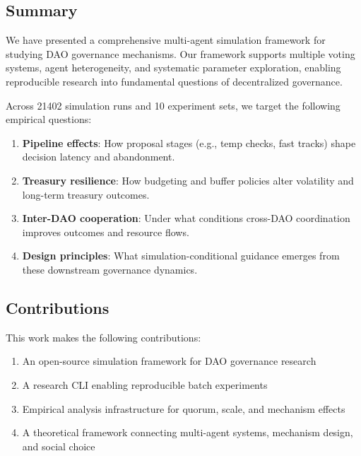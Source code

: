 
\subsection{Summary}

We have presented a comprehensive multi-agent simulation framework for studying DAO governance mechanisms. Our framework supports multiple voting systems, agent heterogeneity, and systematic parameter exploration, enabling reproducible research into fundamental questions of decentralized governance.

Across 21402 simulation runs and 10 experiment sets, we target the following empirical questions:

\begin{enumerate}
    \item \textbf{Pipeline effects}: How proposal stages (e.g., temp checks, fast tracks) shape decision latency and abandonment.

    \item \textbf{Treasury resilience}: How budgeting and buffer policies alter volatility and long-term treasury outcomes.

    \item \textbf{Inter-DAO cooperation}: Under what conditions cross-DAO coordination improves outcomes and resource flows.

    \item \textbf{Design principles}: What simulation-conditional guidance emerges from these downstream governance dynamics.
\end{enumerate}

\subsection{Contributions}

This work makes the following contributions:

\begin{enumerate}
    \item An open-source simulation framework for DAO governance research
    \item A research CLI enabling reproducible batch experiments
    \item Empirical analysis infrastructure for quorum, scale, and mechanism effects
    \item A theoretical framework connecting multi-agent systems, mechanism design, and social choice
\end{enumerate}

